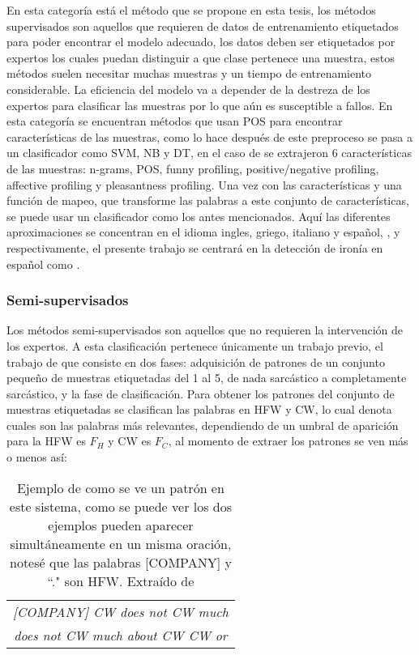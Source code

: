 \par En esta categoría está el método que se propone en esta tesis, los métodos supervisados son aquellos que requieren de datos de entrenamiento etiquetados para poder encontrar el modelo adecuado, los datos deben ser etiquetados por expertos los cuales puedan distinguir a que clase pertenece una muestra, estos métodos suelen necesitar muchas muestras y un tiempo de entrenamiento considerable. La eficiencia del modelo va a depender de la destreza de los expertos para clasificar las muestras por lo que aún es susceptible a fallos. En esta categoría se encuentran métodos que usan \gls{POS} para encontrar características de las muestras, como lo hace \cite{reyes2012making} después de este preproceso se pasa a un clasificador como \gls{SVM}, \gls{NB} y \gls{DT}, en el caso de \cite{reyes2012making} se extrajeron 6 características de las muestras: \gls{n-grams}, \gls{POS}, funny profiling, positive/negative profiling, affective profiling y pleasantness profiling. Una vez con las características y una función de mapeo, %
que transforme las palabras a este conjunto de características, se puede usar un clasificador como los antes mencionados.
Aquí las diferentes aproximaciones se concentran en el idioma ingles, griego, italiano y español, \cite{charalampakis2015detecting}, \cite{barbieri2014italian} y \cite{lopez2016character} respectivamente, el presente trabajo se centrará en la detección de ironía en español como \cite{lopez2016character}.

\subsubsection{Semi-supervisados}

\par Los métodos semi-supervisados son aquellos que no requieren la intervención de los expertos. A esta clasificación pertenece únicamente un trabajo previo, el trabajo de \cite{davidov2010semi} que consiste en dos fases: adquisición de patrones de un conjunto pequeño de muestras etiquetadas del 1 al 5, de nada sarcástico a completamente sarcástico,  y la fase de clasificación. Para obtener los patrones del conjunto de muestras etiquetadas se clasifican las palabras en \gls{HFW} y \gls{CW}, lo cual denota cuales son las palabras más relevantes, dependiendo de un umbral de aparición para la \gls{HFW} es $F_H$ y \gls{CW} es $F_C$, al momento de extraer los patrones se ven más o menos así:

\begin{table}[H]
	\centering
	\begin{tabular}{|c|}
		\hline
		\textit{[COMPANY] CW  does not CW much}  \\
		\textit{does not CW much about CW CW or} \\
		\hline
	\end{tabular}
	\caption{\footnotesize{Ejemplo de como se ve un patrón en este sistema, como se puede ver los dos ejemplos pueden aparecer simultáneamente en un misma oración, notesé que las palabras [COMPANY] y ``." son \gls{HFW}. Extraído de \cite{davidov2010semi}}}
	\label{tab:ejemplo}
\end{table}

